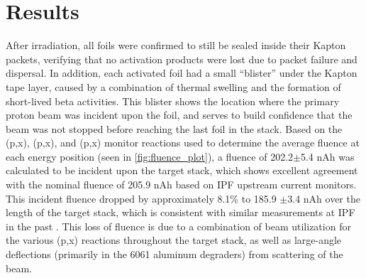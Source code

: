 \documentclass[3p]{elsarticle}
\begin{document}
\section{Results}


After irradiation, all foils were confirmed to still be sealed inside their Kapton packets, verifying that no activation products were lost due to packet failure and dispersal.
In addition, each activated foil had a small \enquote{blister} under the Kapton tape layer, caused by a combination of thermal swelling and the formation of short-lived beta activities.
This blister   shows the location where the primary proton beam was incident upon the foil, and serves to build confidence that the beam was not stopped before reaching the last foil in the stack.
Based on the (p,x), (p,x), and (p,x) monitor reactions used to determine the average fluence at each energy position (seen in \autoref{fig:fluence_plot}), a fluence of 202.2$\pm$5.4 nAh was calculated to be incident upon the target stack, which shows excellent agreement with the nominal fluence of 205.9 nAh based on IPF upstream current monitors.
This incident fluence dropped by approximately 8.1\% to  185.9 $\pm$3.4 nAh over the length of the target stack, which is consistent with similar measurements at IPF in the past \cite{Graves2016}.
This loss of fluence is due to a combination of beam utilization for the various (p,x) reactions throughout the target stack, as well as large-angle deflections (primarily in the 6061 aluminum degraders) from scattering of the beam.
\end{document}
